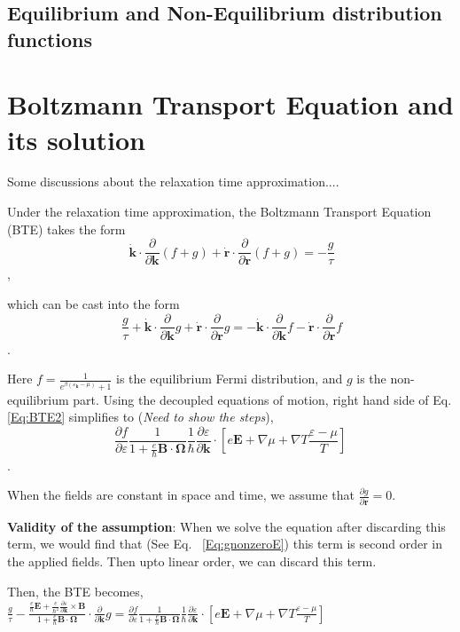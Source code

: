 \documentclass[aps,amsmath,prl]{revtex4-2}
\newcommand{\bvec}[1]{{\mathbf #1}}
\begin{document}
\subsection{Equilibrium and Non-Equilibrium distribution functions}
\section{Boltzmann Transport Equation and its solution}
Some discussions about the relaxation time approximation....

Under the relaxation time approximation, the Boltzmann Transport Equation (BTE) takes the form
\begin{equation}~\label{Eq:BTE}
\dot{\bvec{k}}\cdot\frac{\partial}{\partial \bvec{k}} (f + g) + \dot{\bvec{r}}\cdot\frac{\partial}{\partial \bvec{r}} (f + g) = -\frac{g}{\tau}
\end{equation},

which can be cast into the form
\begin{equation}~\label{Eq:BTE2}
	\frac{g}{\tau} + \dot{\bvec{k}}\cdot\frac{\partial}{\partial \bvec{k}} g + \dot{\bvec{r}}\cdot\frac{\partial}{\partial \bvec{r}} g = -\dot{\bvec{k}}\cdot\frac{\partial}{\partial \bvec{k}}f - \dot{\bvec{r}}\cdot\frac{\partial}{\partial \bvec{r}}f
\end{equation}.

Here $f = \frac{1}{e^{\beta(\varepsilon_{\bvec{k}} - \mu)} + 1}$ is the equilibrium Fermi distribution, and $g$ is the non-equilibrium part.
Using the decoupled equations of motion, right hand side of Eq. \eqref{Eq:BTE2} simplifies to (\textit{Need to show the steps}),
$$\frac{\partial f}{\partial \varepsilon}\frac{1}{1 + \frac{e}{\hbar} \bvec{B}\cdot\bvec{\Omega}}
\frac{1}{\hbar} \frac{\partial \varepsilon}{\partial \bvec{k}}\cdot\left[e \bvec{E} + \nabla{\mu} + \nabla T \frac{\varepsilon - \mu}{T}\right]
$$.

When the fields are constant in space and time, we assume that $\frac{\partial{g}}{\partial \bvec{r}} = 0$.

\textbf{Validity of the assumption}: When we solve the equation after discarding this term, we would find that (See Eq. ~\eqref{Eq:gnonzeroE}) this term is second order in the applied fields. Then upto linear order, we can discard this term.

Then, the BTE becomes,
$\frac{g}{\tau} -\frac{\frac{e}{\hbar} \bvec{E} +\frac{e}{\hbar^2} \frac{\partial \varepsilon}{\partial \bvec{k}} \times \bvec{B}}{1 + \frac{e}{\hbar} \bvec{B}\cdot\bvec{\Omega}} \cdot\frac{\partial}{\partial \bvec{k}} g = \frac{\partial f}{\partial \varepsilon}\frac{1}{1 + \frac{e}{\hbar} \bvec{B}\cdot\bvec{\Omega}}
\frac{1}{\hbar} \frac{\partial \varepsilon}{\partial \bvec{k}}\cdot\left[e \bvec{E} + \nabla{\mu} + \nabla T \frac{\varepsilon - \mu}{T}\right] $
\end{document}
